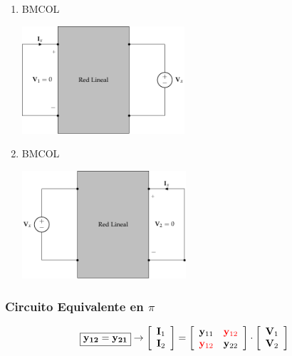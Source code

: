 \begin{enumerate}
\item \hfill{}\textsc{BMCOL}
\label{sec:org6237778}
\begin{center}
\includegraphics[height=4cm]{../figs/reciprocidadY_entrada.pdf}
\end{center}
\item \hfill{}\textsc{BMCOL}
\label{sec:orgf1cf80d}
\begin{center}
\includegraphics[height=4cm]{../figs/reciprocidadY_salida.pdf}
\end{center}
\end{enumerate}
\subsubsection{Circuito Equivalente en \(\pi\)}
\label{sec:org2f3cf9b}
\[
\boxed{\mathbf{y_{12}} = \mathbf{y_{21}}}
\rightarrow
\left[
    \begin{array}{c}
      \mathbf{I}_1\\
      \mathbf{I}_2
    \end{array}
  \right] =
  \left[
    \begin{array}{cc}
      \mathbf{y}_{11} & \color{red}{\mathbf{y}_{12}}\\
      \color{red}{\mathbf{y}_{12}} & \mathbf{y}_{22}
    \end{array}
  \right] \cdot
  \left[
    \begin{array}{c}
      \mathbf{V}_1\\
      \mathbf{V}_2
    \end{array}
  \right]
\]

